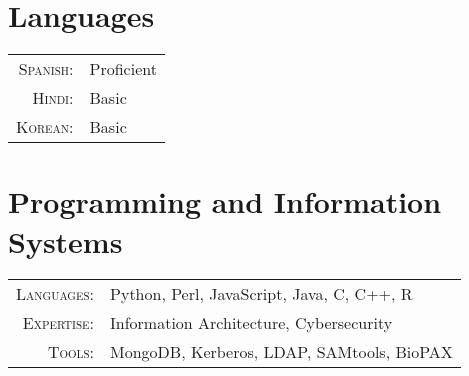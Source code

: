 \documentclass[a4paper,10pt]{article}
\begin{document}
\section{Languages}
\begin{tabular}{rl}
\textsc{Spanish:}&Proficient\\
\textsc{Hindi:}&Basic\\
\textsc{Korean:}&Basic\\
\end{tabular}

\section{Programming and Information Systems}
\begin{tabular}{rl}
\textsc{Languages:}&Python, Perl, JavaScript, Java, C, C++, R\\
\textsc{Expertise:}&Information Architecture, Cybersecurity\\
\textsc{Tools:}&MongoDB, Kerberos, LDAP, SAMtools, BioPAX
\end{tabular}
\end{document}
